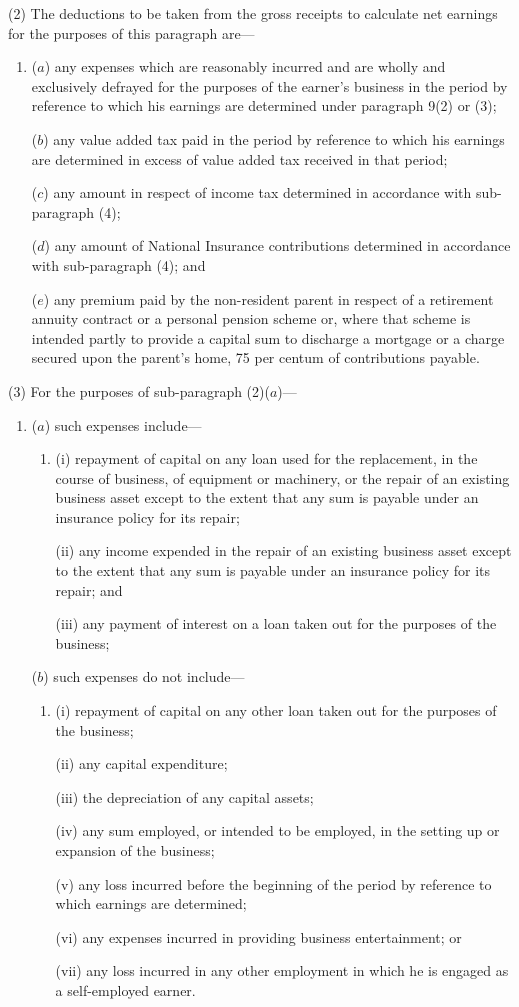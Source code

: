 \documentclass[12pt,a4paper]{article}
\begin{document}
(2) The deductions to be taken from the gross receipts to calculate net earnings for the purposes of this paragraph are—
\begin{enumerate}\item[]
($a$) any expenses which are reasonably incurred and are wholly and exclusively defrayed for the purposes of the earner’s business in the period by reference to which his earnings are determined under paragraph 9(2) or (3);

($b$) any value added tax paid in the period by reference to which his earnings are determined in excess of value added tax received in that period;

($c$) any amount in respect of income tax determined in accordance with sub-paragraph (4);

($d$) any amount of National Insurance contributions determined in accordance with sub-paragraph (4); and

($e$) any premium paid by the non-resident parent in respect of a retirement annuity contract or a personal pension scheme or, where that scheme is intended partly to provide a capital sum to discharge a mortgage or a charge secured upon the parent’s home, 75 per centum of contributions payable.
\end{enumerate}

(3) For the purposes of sub-paragraph (2)($a$)—
\begin{enumerate}\item[]
($a$) such expenses include—
\begin{enumerate}\item[]
(i) repayment of capital on any loan used for the replacement, in the course of business, of equipment or machinery, or the repair of an existing business asset except to the extent that any sum is payable under an insurance policy for its repair;

(ii) any income expended in the repair of an existing business asset except to the extent that any sum is payable under an insurance policy for its repair; and

(iii) any payment of interest on a loan taken out for the purposes of the business;
\end{enumerate}

($b$) such expenses do not include—
\begin{enumerate}\item[]
(i) repayment of capital on any other loan taken out for the purposes of the business;

(ii) any capital expenditure;

(iii) the depreciation of any capital assets;

(iv) any sum employed, or intended to be employed, in the setting up or expansion of the business;

(v) any loss incurred before the beginning of the period by reference to which earnings are determined;

(vi) any expenses incurred in providing business entertainment; or

(vii) any loss incurred in any other employment in which he is engaged as a self-employed earner.
\end{enumerate}
\end{enumerate}
\end{document}

